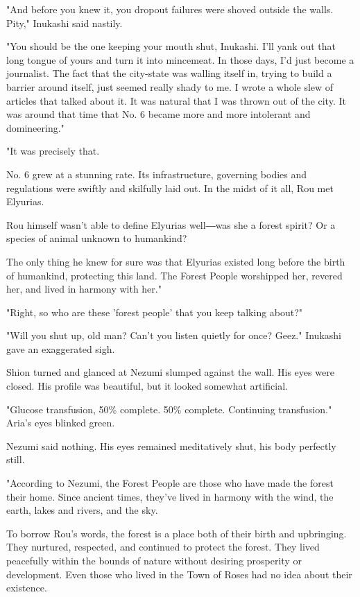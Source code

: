 "And before you knew it, you dropout failures were shoved outside the
walls. Pity," Inukashi said nastily.

"You should be the one keeping your mouth shut, Inukashi. I'll yank out
that long tongue of yours and turn it into mincemeat. In those days, I'd
just become a journalist. The fact that the city-state was walling
itself in, trying to build a barrier around itself, just seemed really
shady to me. I wrote a whole slew of articles that talked about it. It
was natural that I was thrown out of the city. It was around that time
that No. 6 became more and more intolerant and domineering."

"It was precisely that.

No. 6 grew at a stunning rate. Its infrastructure, governing bodies and
regulations were swiftly and skilfully laid out. In the midst of it all,
Rou met Elyurias.

Rou himself wasn't able to define Elyurias well―was she a forest spirit?
Or a species of animal unknown to humankind?

The only thing he knew for sure was that Elyurias existed long before
the birth of humankind, protecting this land. The Forest People
worshipped her, revered her, and lived in harmony with her."

"Right, so who are these 'forest people' that you keep talking about?"

"Will you shut up, old man? Can't you listen quietly for once? Geez."
Inukashi gave an exaggerated sigh.

Shion turned and glanced at Nezumi slumped against the wall. His eyes
were closed. His profile was beautiful, but it looked somewhat
artificial.

{\sffamily "Glucose transfusion, 50\% complete. 50\% complete. Continuing
transfusion."} Aria's eyes blinked green.

Nezumi said nothing. His eyes remained meditatively shut, his body
perfectly still.

\mybreak

"According to Nezumi, the Forest People are those who have made the
forest their home. Since ancient times, they've lived in harmony with
the wind, the earth, lakes and rivers, and the sky.

To borrow Rou's words, the forest is a place both of their birth and
upbringing. They nurtured, respected, and continued to protect the
forest. They lived peacefully within the bounds of nature without
desiring prosperity or development. Even those who lived in the Town of
Roses had no idea about their existence.

